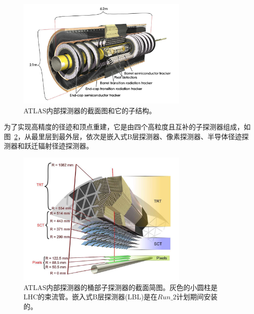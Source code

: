 \begin{figure}
  \begin{center}
    \includegraphics[width=0.75\textwidth]{figuresEXP/ATLAS6.jpg}
  \end{center}
  \caption{
 \textsc{ATLAS}内部探测器的截面图和它的子结构。
  }
    \label{fig:ATLAS6}
\end{figure}

为了实现高精度的径迹和顶点重建，它是由四个高粒度且互补的子探测器组成，如图~\ref{fig:ATLAS7}，从最里层到最外层，依次是嵌入式B层探测器、像素探测器、半导体径迹探测器和跃迁辐射径迹探测器。

\begin{figure}
  \begin{center}
    \includegraphics[width=0.75\textwidth]{figuresEXP/ATLAS7.jpg}
  \end{center}
  \caption{
 \textsc{ATLAS}内部探测器的桶部子探测器的截面简图。灰色的小圆柱是LHC的束流管。嵌入式B层探测器(LBL)是在$Run\_2$计划期间安装的。
  }
    \label{fig:ATLAS7}
\end{figure}

